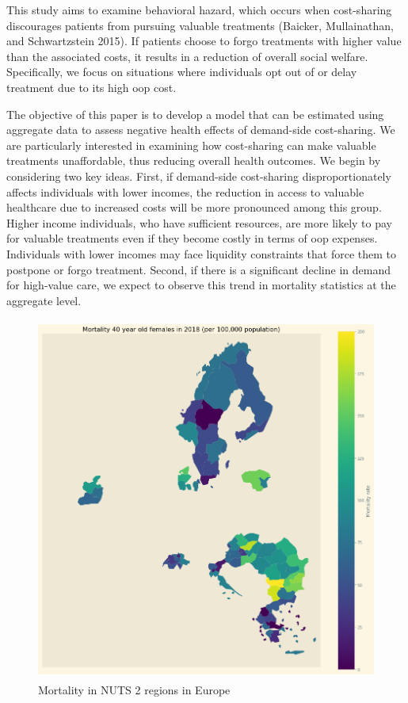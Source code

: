 \documentclass[a4paper,12pt]{article}
\makeatletter
\newcommand{\citeprocitem}[2]{\hyper@linkstart{cite}{citeproc_bib_item_#1}#2\hyper@linkend}
\makeatother
\begin{document}
This study aims to examine behavioral hazard, which occurs when cost-sharing discourages patients from pursuing valuable treatments (\citeprocitem{1}{Baicker, Mullainathan, and Schwartzstein 2015}). If patients choose to forgo treatments with higher value than the associated costs, it results in a reduction of overall social welfare. Specifically, we focus on situations where individuals opt out of or delay treatment due to its high oop cost.

The objective of this paper is to develop a model that can be estimated using aggregate data to assess negative health effects of demand-side cost-sharing. We are particularly interested in examining how cost-sharing can make valuable treatments unaffordable, thus reducing overall health outcomes. We begin by considering two key ideas. First, if demand-side cost-sharing disproportionately affects individuals with lower incomes, the reduction in access to valuable healthcare due to increased costs will be more pronounced among this group. Higher income individuals, who have sufficient resources, are more likely to pay for valuable treatments even if they become costly in terms of oop expenses. Individuals with lower incomes may face liquidity constraints that force them to postpone or forgo treatment. Second, if there is a significant decline in demand for high-value care, we expect to observe this trend in mortality statistics at the aggregate level.

\begin{figure}[htbp]
\centering
\includegraphics[height=12cm]{./figures/Europe_mortality_40_F_2018.png}
\caption{\label{fig:EUmap}Mortality in NUTS 2 regions in Europe}
\end{figure}
\end{document}
